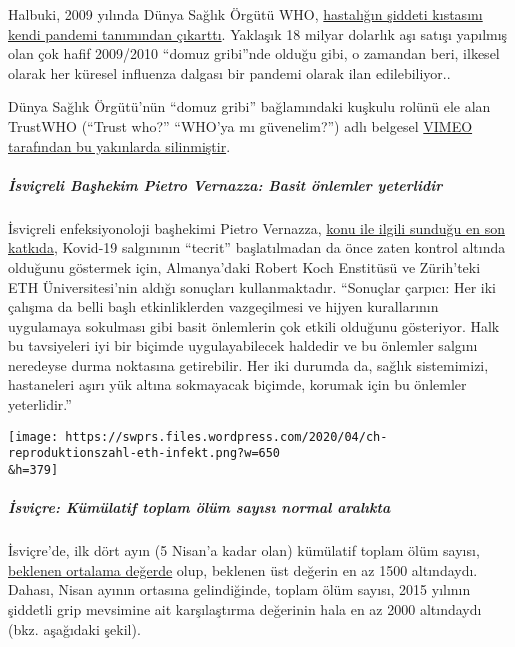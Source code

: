 Halbuki, 2009 yılında Dünya Sağlık Örgütü WHO,
\href{https://www.forbes.com/2010/02/05/world-health-organization-swine-flu-pandemic-opinions-contributors-michael-fumento.html\#5ae32fb848e8}{hastalığın
şiddeti kıstasını kendi pandemi tanımından çıkarttı}. Yaklaşık 18 milyar
dolarlık aşı satışı yapılmış olan çok hafif 2009/2010 ``domuz gribi''nde
olduğu gibi, o zamandan beri, ilkesel olarak her küresel influenza
dalgası bir pandemi olarak ilan edilebiliyor..

Dünya Sağlık Örgütü'nün ``domuz gribi'' bağlamındaki kuşkulu rolünü ele
alan TrustWHO (``Trust who?'' ``WHO'ya mı güvenelim?'') adlı belgesel
\href{https://www.youtube.com/watch?v=VjQGyqVN5RM}{VIMEO tarafından bu
yakınlarda silinmiştir}.

\hypertarget{isviuxe7reli-baux15fhekim-pietro-vernazza-basit-uxf6nlemler-yeterlidir}{%
\subparagraph{\texorpdfstring{\textbf{İsviçreli Başhekim Pietro
Vernazza: Basit önlemler
yeterlidir}}{İsviçreli Başhekim Pietro Vernazza: Basit önlemler yeterlidir}}\label{isviuxe7reli-baux15fhekim-pietro-vernazza-basit-uxf6nlemler-yeterlidir}}

İsviçreli enfeksiyonoloji başhekimi Pietro Vernazza,
\href{https://infekt.ch/2020/04/sind-wir-tatsaechlich-im-blindflug/}{konu
ile ilgili sunduğu en son katkıda}, Kovid-19 salgınının ``tecrit''
başlatılmadan da önce zaten kontrol altında olduğunu göstermek için,
Almanya'daki Robert Koch Enstitüsü ve Zürih'teki ETH Üniversitesi'nin
aldığı sonuçları kullanmaktadır. ``Sonuçlar çarpıcı: Her iki çalışma da
belli başlı etkinliklerden vazgeçilmesi ve hijyen kurallarının
uygulamaya sokulması gibi basit önlemlerin çok etkili olduğunu
gösteriyor. Halk bu tavsiyeleri iyi bir biçimde uygulayabilecek haldedir
ve bu önlemler salgını neredeyse durma noktasına getirebilir. Her iki
durumda da, sağlık sistemimizi, hastaneleri aşırı yük altına sokmayacak
biçimde, korumak için bu önlemler yeterlidir.''

\texttt{[image: https://swprs.files.wordpress.com/2020/04/ch-reproduktionszahl-eth-infekt.png?w=650\\\&h=379]}

\hypertarget{isviuxe7re-kuxfcmuxfclatif-toplam-uxf6luxfcm-sayux131sux131-normal-aralux131kta}{%
\subparagraph{\texorpdfstring{\textbf{İsviçre: Kümülatif toplam ölüm
sayısı normal
aralıkta}}{İsviçre: Kümülatif toplam ölüm sayısı normal aralıkta}}\label{isviuxe7re-kuxfcmuxfclatif-toplam-uxf6luxfcm-sayux131sux131-normal-aralux131kta}}

İsviçre'de, ilk dört ayın (5 Nisan'a kadar olan) kümülatif toplam ölüm
sayısı,
\href{https://swprs.files.wordpress.com/2020/04/ch-sterblichkeit-kumuliert-q1-2020.pdf}{beklenen
ortalama değerde} olup, beklenen üst değerin en az 1500 altındaydı.
Dahası, Nisan ayının ortasına gelindiğinde, toplam ölüm sayısı, 2015
yılının şiddetli grip mevsimine ait karşılaştırma değerinin hala en az
2000 altındaydı (bkz. aşağıdaki şekil).

